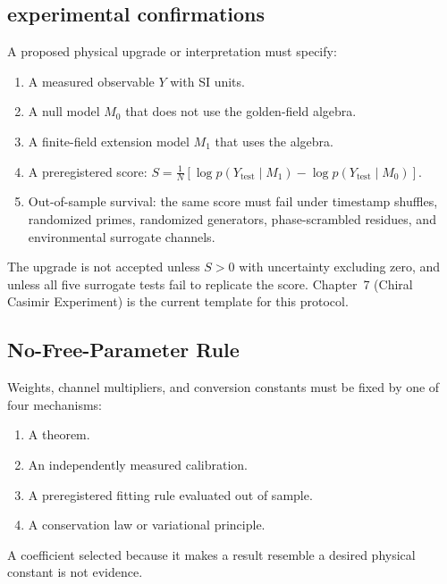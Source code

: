 \documentclass[12pt,oneside]{book}
\theoremstyle{principia}
\theoremstyle{definition}
\theoremstyle{remark}
\begin{document}
\subsection{experimental confirmations}
A proposed physical upgrade or interpretation must specify:
\begin{enumerate}[noitemsep]
\item A measured observable $Y$ with SI units.
\item A null model $M_0$ that does not use the golden-field algebra.
\item A finite-field extension model $M_1$ that uses the algebra.
\item A preregistered score: $S = \frac{1}{N}[\log p(Y_{\text{test}} \mid M_1) - \log p(Y_{\text{test}} \mid M_0)]$.
\item Out-of-sample survival: the same score must fail under timestamp shuffles, randomized primes, randomized generators, phase-scrambled residues, and environmental surrogate channels.
\end{enumerate}
\noindent The upgrade is not accepted unless $S > 0$ with uncertainty excluding zero, and unless all five surrogate tests fail to replicate the score. Chapter~7 (Chiral Casimir Experiment) is the current template for this protocol.

\subsection{No-Free-Parameter Rule}
Weights, channel multipliers, and conversion constants must be fixed by one of four mechanisms:
\begin{enumerate}[noitemsep]
\item A theorem.
\item An independently measured calibration.
\item A preregistered fitting rule evaluated out of sample.
\item A conservation law or variational principle.
\end{enumerate}
\noindent A coefficient selected because it makes a result resemble a desired physical constant is not evidence.

\end{document}
